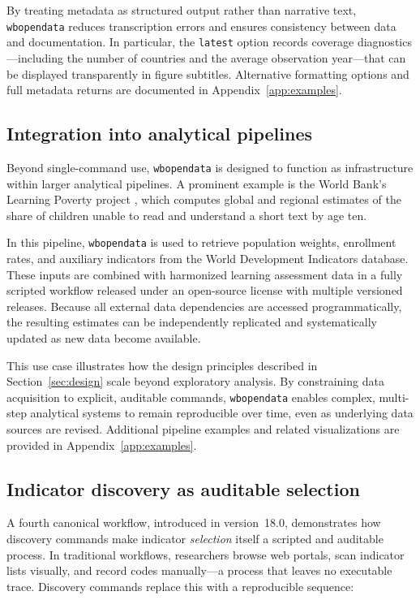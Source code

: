 \documentclass[bib]{statapress}
\begin{document}
By treating metadata as structured output rather than narrative text,
\texttt{wbopendata} reduces transcription errors and ensures consistency between
data and documentation. In particular, the \texttt{latest} option records
coverage diagnostics---including the number of countries and the average
observation year---that can be displayed transparently in figure subtitles.
Alternative formatting options and full metadata returns are documented in
Appendix~\ref{app:examples}.

\subsection{Integration into analytical pipelines}\label{sec:workflow-pipeline}

Beyond single-command use, \texttt{wbopendata} is designed to function as
infrastructure within larger analytical pipelines. A prominent example is the
World Bank’s Learning Poverty project \citep{worldbank2019learningpoverty}, which computes global and regional
estimates of the share of children unable to read and understand a short text by
age ten.

In this pipeline, \texttt{wbopendata} is used to retrieve population weights,
enrollment rates, and auxiliary indicators from the World Development Indicators
database. These inputs are combined with harmonized learning assessment data in
a fully scripted workflow released under an open-source license with multiple
versioned releases. Because all external data dependencies are accessed
programmatically, the resulting estimates can be independently replicated and
systematically updated as new data become available.

This use case illustrates how the design principles described in Section~\ref{sec:design} scale
beyond exploratory analysis. By constraining data acquisition to explicit,
auditable commands, \texttt{wbopendata} enables complex, multi-step analytical
systems to remain reproducible over time, even as underlying data sources are
revised. Additional pipeline examples and related visualizations are provided in
Appendix~\ref{app:examples}.

\subsection{Indicator discovery as auditable selection}\label{sec:workflow-discovery}

A fourth canonical workflow, introduced in version~18.0, demonstrates how
discovery commands make indicator \emph{selection} itself a scripted and
auditable process. In traditional workflows, researchers browse web portals,
scan indicator lists visually, and record codes manually---a process that
leaves no executable trace. Discovery commands replace this with a
reproducible sequence:
\end{document}

